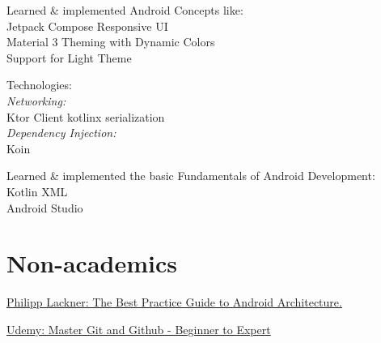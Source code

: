 \documentclass[]{deedy-resume-openfont}
\begin{document}
\begin{minipage}[t]{0.66\textwidth}
\href{https://github.com/mdabdulazizzisan/Crypto-Tracker}{}
\begin{tightemize}
\item Learned \& implemented Android Concepts like: \\
\quad \textbullet{} Jetpack Compose \textbullet{} Responsive UI \\
\quad \textbullet{} Material 3 Theming with Dynamic Colors \\
\quad \textbullet{} Support for Light Theme \\
\item Technologies: \\
\quad \textit{Networking:} \\
\quad \quad \textbullet{} Ktor Client \textbullet{} kotlinx serialization \\
\quad \textit{Dependency Injection:} \\
\quad \quad \textbullet{} Koin \\
\end{tightemize}
\sectionsep

\begin{tightemize}
\item Learned \& implemented the basic Fundamentals of Android Development: \\
\quad \textbullet{} Kotlin \textbullet{} XML \\
\quad \textbullet{} Android Studio \\
\end{tightemize}
\sectionsep






\section{Non-academics}
\begin{tightemize} 
\item \href{https://pl-coding.com/best-practice-guide}{Philipp Lackner: The Best Practice Guide to Android Architecture.}
\item \href{https://www.udemy.com/certificate/UC-b3157d51-19c3-4510-a924-2206bc5a0903/}{Udemy: Master Git and Github - Beginner to Expert}
\end{tightemize}
\sectionsep



%
% 
% 

\end{minipage} 
\end{document}
